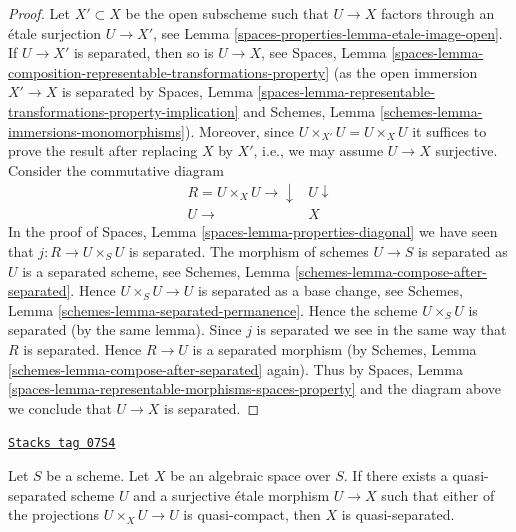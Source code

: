 \begin{proof}
Let $X' \subset X$ be the open subscheme such that $U \to X$ factors
through an \'etale surjection $U \to X'$, see
Lemma \ref{spaces-properties-lemma-etale-image-open}.
If $U \to X'$ is separated, then so is $U \to X$, see
Spaces, Lemma
\ref{spaces-lemma-composition-representable-transformations-property}
(as the open immersion $X' \to X$ is separated by
Spaces, Lemma
\ref{spaces-lemma-representable-transformations-property-implication}
and
Schemes, Lemma \ref{schemes-lemma-immersions-monomorphisms}).
Moreover, since $U \times_{X'} U = U \times_X U$ it suffices
to prove the result after replacing $X$ by $X'$, i.e., we may
assume $U \to X$ surjective.
Consider the commutative diagram
$$
\begin{array}{cc}R = U \times_X U \longrightarrow\downarrow & U \downarrow \\ U \longrightarrow & X\end{array}
$$
In the proof of
Spaces, Lemma \ref{spaces-lemma-properties-diagonal}
we have seen that $j : R \to U \times_S U$ is separated.
The morphism of schemes $U \to S$ is separated as $U$ is a separated
scheme, see
Schemes, Lemma \ref{schemes-lemma-compose-after-separated}.
Hence $U \times_S U \to U$ is separated as a base change, see
Schemes, Lemma \ref{schemes-lemma-separated-permanence}.
Hence the scheme $U \times_S U$ is separated (by the same lemma).
Since $j$ is separated we see in the same way that $R$ is separated.
Hence $R \to U$ is a separated morphism (by
Schemes, Lemma \ref{schemes-lemma-compose-after-separated}
again). Thus by
Spaces, Lemma \ref{spaces-lemma-representable-morphisms-spaces-property}
and the diagram above we conclude that $U \to X$ is separated.
\end{proof}

\begin{lemma}
\label{spaces-properties-lemma-quasi-separated}
\href{https://stacks.math.columbia.edu/tag/07S4}{\texttt{Stacks tag 07S4}}

Let $S$ be a scheme. Let $X$ be an algebraic space over $S$.
If there exists a quasi-separated scheme $U$ and a surjective
\'etale morphism $U \to X$ such that either of the projections
$U \times_X U \to U$ is quasi-compact, then $X$ is quasi-separated.
\end{lemma}

